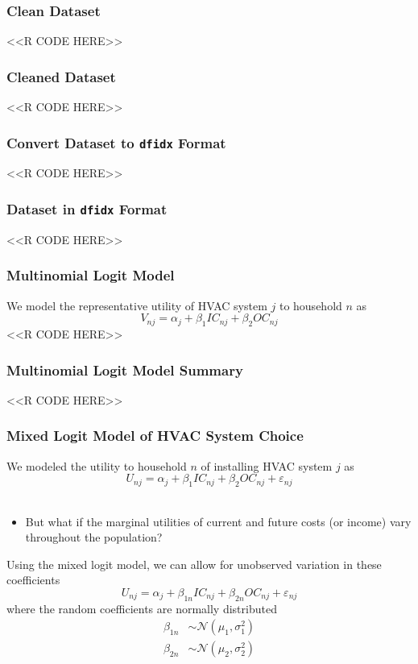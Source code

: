 \documentclass{beamer}
\begin{document}
\begin{frame}[fragile]\frametitle{Clean Dataset}
    <<R CODE HERE>>
\end{frame}

\begin{frame}[fragile]\frametitle{Cleaned Dataset}
    <<R CODE HERE>>
\end{frame}

\begin{frame}[fragile]\frametitle{Convert Dataset to \texttt{dfidx} Format}
    <<R CODE HERE>>
\end{frame}

\begin{frame}[fragile]\frametitle{Dataset in \texttt{dfidx} Format}
    <<R CODE HERE>>
\end{frame}

\begin{frame}[fragile]\frametitle{Multinomial Logit Model}
    We model the representative utility of HVAC system $j$ to household $n$ as
    $$V_{nj} = \alpha_j + \beta_1 IC_{nj} + \beta_2 OC_{nj}$$
    <<R CODE HERE>>
\end{frame}

\begin{frame}[fragile]\frametitle{Multinomial Logit Model Summary}
    <<R CODE HERE>>
\end{frame}

\begin{frame}\frametitle{Mixed Logit Model of HVAC System Choice}
    We modeled the utility to household $n$ of installing HVAC system $j$ as
    $$U_{nj} = \alpha_j + \beta_1 IC_{nj} + \beta_2 OC_{nj} + \varepsilon_{nj}$$ \\
    \begin{itemize}
    	\item But what if the marginal utilities of current and future costs (or income) vary throughout the population?
    \end{itemize}
	\vspace{3ex}
	Using the mixed logit model, we can allow for unobserved variation in these coefficients
	$$U_{nj} = \alpha_j + \beta_{1n} IC_{nj} + \beta_{2n} OC_{nj} + \varepsilon_{nj}$$
	where the random coefficients are normally distributed
	\begin{align*}
		\beta_{1n} & \sim \mathcal{N}(\mu_1, \sigma_1^2) \\
		\beta_{2n} & \sim \mathcal{N}(\mu_2, \sigma_2^2)
	\end{align*}
\end{frame}
\end{document}
